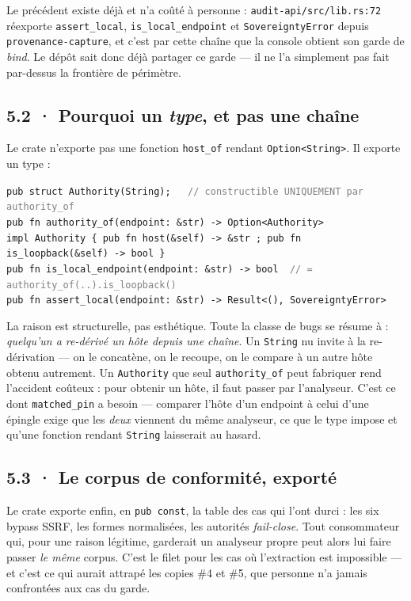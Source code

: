 \documentclass[10pt]{article}
\newcommand{\sz}[1]{\textcolor{grey}{\small\textsf{#1}}}
\newcommand{\code}[1]{\texttt{\small #1}}
\begin{document}
Le précédent existe déjà et n'a coûté à personne : \code{audit-api/src/lib.rs:72} réexporte
\code{assert\_local}, \code{is\_local\_endpoint} et \code{SovereigntyError} depuis
\code{provenance-capture}, et c'est par cette chaîne que la console obtient son garde de \emph{bind}.
Le dépôt sait donc déjà partager ce garde --- il ne l'a simplement pas fait par-dessus la frontière
de périmètre.

\subsection{5.2 · Pourquoi un \emph{type}, et pas une chaîne}

Le crate n'exporte pas une fonction \code{host\_of} rendant \code{Option<String>}. Il exporte un type :

\begin{extrait}
\code{pub struct Authority(String);\ \ \ \sz{// constructible UNIQUEMENT par authority\_of}} \\
\code{pub fn authority\_of(endpoint: \&str) -> Option<Authority>} \\
\code{impl Authority \{ pub fn host(\&self) -> \&str ; pub fn is\_loopback(\&self) -> bool \}} \\[3pt]
\code{pub fn is\_local\_endpoint(endpoint: \&str) -> bool \ \sz{// = authority\_of(..).is\_loopback()}} \\
\code{pub fn assert\_local(endpoint: \&str) -> Result<(), SovereigntyError>}
\end{extrait}

La raison est structurelle, pas esthétique. Toute la classe de bugs se résume à : \emph{quelqu'un a
re-dérivé un hôte depuis une chaîne}. Un \code{String} nu invite à la re-dérivation --- on le
concatène, on le recoupe, on le compare à un autre hôte obtenu autrement. Un \code{Authority} que
seul \code{authority\_of} peut fabriquer rend l'accident coûteux : pour obtenir un hôte, il faut
passer par l'analyseur. C'est ce dont \code{matched\_pin} a besoin --- comparer l'hôte d'un endpoint
à celui d'une épingle exige que les \emph{deux} viennent du même analyseur, ce que le type impose et
qu'une fonction rendant \code{String} laisserait au hasard.

\subsection{5.3 · Le corpus de conformité, exporté}

Le crate exporte enfin, en \code{pub const}, la table des cas qui l'ont durci : les six bypass SSRF,
les formes normalisées, les autorités \emph{fail-close}. Tout consommateur qui, pour une raison
légitime, garderait un analyseur propre peut alors lui faire passer \emph{le même} corpus. C'est le
filet pour les cas où l'extraction est impossible --- et c'est ce qui aurait attrapé les copies
\#4 et \#5, que personne n'a jamais confrontées aux cas du garde.
\end{document}

